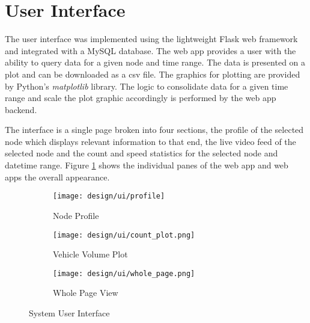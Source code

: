 \section{User Interface}

The user interface was implemented using the lightweight Flask web framework and integrated with a MySQL database. The web app provides a user with the ability to query data for a given node and time range. The data is presented on a plot and can be downloaded as a csv file. The graphics for plotting are provided by Python's \emph{matplotlib} library. The logic to consolidate data for a given time range and scale the plot graphic accordingly is performed by the web app backend.

The interface is a single page broken into four sections, the profile of the selected node which displays relevant information to that end, the live video feed of the selected node and the count and speed statistics for the selected node and datetime range. Figure \ref{fig:dragonfly} shows the individual panes of the web app and web apps the overall appearance.

\begin{figure}[H]
	\centering
    \begin{subfigure}[b]{0.5\linewidth}
        \centering\texttt{[image: design/ui/profile]}
        \caption{Node Profile}
    \end{subfigure}
    \begin{subfigure}[b]{0.5\linewidth}
        \centering\texttt{[image: design/ui/count\_plot.png]}
        \caption{Vehicle Volume Plot}
    \end{subfigure}
    \begin{subfigure}[b]{0.5\linewidth}
        \centering\texttt{[image: design/ui/whole\_page.png]}
        \caption{Whole Page View}
    \end{subfigure}
    	\caption{System User Interface}
    	\label{fig:dragonfly}
\end{figure}


